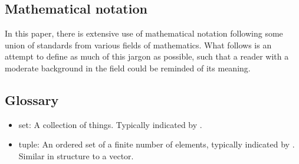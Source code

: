 \appendixpage
\begin{appendix}
\chapter{Mathematical notation}
\label{sec:notation}
In this paper, there is extensive use of mathematical notation following some union of standards from various fields of mathematics. What follows is an attempt to define as much of this jargon as possible, such that a reader with a moderate background in the field could be reminded of its meaning.


\section{Glossary}
\begin{itemize}
\item set: A collection of things. Typically indicated by \braces{\cdot}.
\item tuple: An ordered set of a finite number of elements, typically indicated by \parens{\cdot}. Similar in structure to a vector.
\end{itemize}


\end{appendix}
